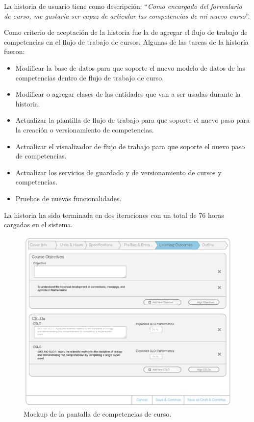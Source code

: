La historia de usuario tiene como descripción: \enquote{\textit{Como encargado del formulario de curso, me gustaría ser capaz de articular las competencias de mi nuevo curso}}.

Como criterio de aceptación de la historia fue la de agregar el flujo de trabajo de competencias en el flujo de trabajo de cursos. Algunas de las tareas de la historia fueron:
\begin{itemize}
	\item Modificar la base de datos para que soporte el nuevo modelo de datos de las competencias dentro de flujo de trabajo de curso.
	\item Modificar o agregar clases de las entidades que van a ser usadas durante la historia.
	\item Actualizar la plantilla de flujo de trabajo para que soporte el nuevo paso para la creación o versionamiento de competencias.
	\item Actualizar el visualizador de flujo de trabajo para que soporte el nuevo paso de competencias.
	\item Actualizar los servicios de guardado y de versionamiento de cursos y competencias.
	\item Pruebas de nuevas funcionalidades.
\end{itemize}

La historia ha sido terminada en dos iteraciones con un total de 76 horas cargadas en el sistema.

\begin{figure}[H]
\centering
\includegraphics[scale=0.3]{Capitulos/DesarrollodelaAplicacion/Imagenes/course_learning_outcomes}
\caption{Mockup de la pantalla de competencias de curso.}
  \label{course_learning_outcomes}
\end{figure}

